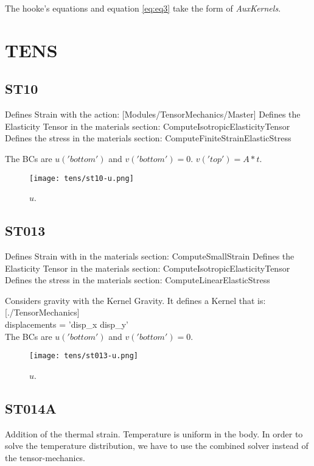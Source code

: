\documentclass[11pt,letterpaper]{article}
\begin{document}
The hooke's equations and equation \ref{eq:eq3} take the form of \textit{AuxKernels}.

\section{TENS}

\subsection{ST10}

Defines Strain with the action: [Modules/TensorMechanics/Master]
Defines the Elasticity Tensor in the materials section: ComputeIsotropicElasticityTensor
Defines the stress in the materials section: ComputeFiniteStrainElasticStress

The BCs are $u('bottom')$ and $v('bottom') = 0$. $v('top')=A*t$.

\begin{figure}[H]
	\centering
	\texttt{[image: tens/st10-u.png]}
	\hfill
	\caption{$u$.}
	\label{fig:st10}
\end{figure}

\subsection{ST013}

Defines Strain with in the materials section: ComputeSmallStrain
Defines the Elasticity Tensor in the materials section: ComputeIsotropicElasticityTensor
Defines the stress in the materials section: ComputeLinearElasticStress

Considers gravity with the Kernel Gravity.
It defines a Kernel that is:
[./TensorMechanics]\\
 displacements = 'disp\_x disp\_y'\\

The BCs are $u('bottom')$ and $v('bottom') = 0$.

\begin{figure}[H]
	\centering
	\texttt{[image: tens/st013-u.png]}
	\hfill
	\caption{$u$.}
	\label{fig:st13}
\end{figure}

\subsection{ST014A}

Addition of the thermal strain. Temperature is uniform in the body.
In order to solve the temperature distribution, we have to use the combined solver instead of the tensor-mechanics.
\end{document}

